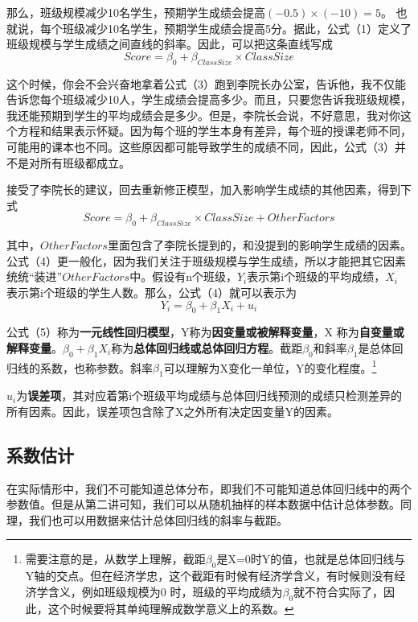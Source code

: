 \documentclass[cn,12pt,math=newtx,citestyle=gb7714-2015,bibstyle=gb7714-2015]{elegantbook}
\begin{document}
	那么，班级规模减少10名学生，预期学生成绩会提高$(-0.5)\times(-10)=5$。 也就说，每个班级减少10名学生，预期学生成绩会提高5分。据此，公式（1）定义了班级规模与学生成绩之间直线的斜率。因此，可以把这条直线写成
	\begin{equation}
		Score=\beta_0+\beta_{ClassSize}\times{ClassSize}
	\end{equation}
	
	这个时候，你会不会兴奋地拿着公式（3）跑到李院长办公室，告诉他，我不仅能告诉您每个班级减少10人，学生成绩会提高多少。而且，只要您告诉我班级规模，我还能预期到学生的平均成绩会是多少。但是，李院长会说，不好意思，我对你这个方程和结果表示怀疑。因为每个班的学生本身有差异，每个班的授课老师不同，可能用的课本也不同。这些原因都可能导致学生的成绩不同，因此，公式（3）并不是对所有班级都成立。
	
	接受了李院长的建议，回去重新修正模型，加入影响学生成绩的其他因素，得到下式
	\begin{equation}
		Score=\beta_0+\beta_{ClassSize}\times{ClassSize}+OtherFactors
	\end{equation}
	
	其中，$OtherFactors$里面包含了李院长提到的，和没提到的影响学生成绩的因素。公式（4）更一般化，因为我们关注于班级规模与学生成绩，所以才能把其它因素统统“装进”$OtherFactors$中。假设有n个班级，$Y_i$表示第i个班级的平均成绩，$X_i$ 表示第i个班级的学生人数。那么，公式（4）就可以表示为
	\begin{equation}
		Y_i=\beta_0+\beta_1X_i+u_i
	\end{equation}
	
	公式（5）称为\textbf{一元线性回归模型}，Y称为\textbf{因变量或被解释变量}，X 称为\textbf{自变量或解释变量}。$\beta_0+\beta_1X_i$称为\textbf{总体回归线或总体回归方程}。截距$\beta_0$和斜率$\beta_1$是总体回归线的系数，也称参数。斜率$\beta_1$可以理解为X变化一单位，Y的变化程度。\footnote{需要注意的是，从数学上理解，截距$\beta_0$是X=0时Y的值，也就是总体回归线与Y轴的交点。但在经济学忠，这个截距有时候有经济学含义，有时候则没有经济学含义，例如班级规模为0 时，班级的平均成绩为$\beta_0$就不符合实际了，因此，这个时候要将其单纯理解成数学意义上的系数。}
	
	$u_i$为\textbf{误差项}，其对应着第i个班级平均成绩与总体回归线预测的成绩只检测差异的所有因素。因此，误差项包含除了X之外所有决定因变量Y的因素。
	
	\subsection{系数估计}
	在实际情形中，我们不可能知道总体分布，即我们不可能知道总体回归线中的两个参数值。但是从第二讲可知，我们可以从随机抽样的样本数据中估计总体参数。同理，我们也可以用数据来估计总体回归线的斜率与截距。
	
\end{document}
